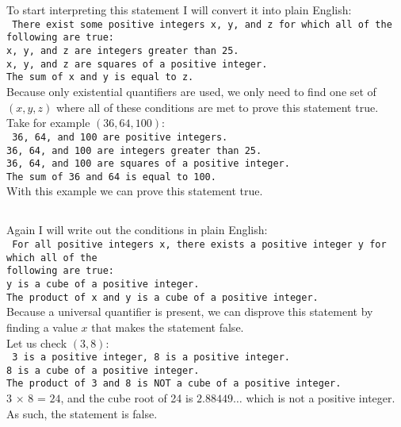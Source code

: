 \documentclass[draft]{article}
\begin{document}
\section{}
\subsection{}
To start interpreting this statement I will convert it into plain English: \\
\texttt{
There exist some positive integers x, y, and z for which all of the following are true: \\
x, y, and z are integers greater than 25. \\
x, y, and z are squares of a positive integer. \\
The sum of x and y is equal to z. \\
}
Because only existential quantifiers are used, we only need to find one set of $(x,y,z)$ 
where all of these conditions are met to prove this statement true. \\
Take for example $(36,64,100)$: \\
\texttt{
36, 64, and 100 are positive integers. \\
36, 64, and 100 are integers greater than 25. \\
36, 64, and 100 are squares of a positive integer. \\
The sum of 36 and 64 is equal to 100. \\
}
With this example we can prove this statement true.

\subsection{}
Again I will write out the conditions in plain English: \\
\texttt{
For all positive integers x, there exists a positive integer y for which all of the \\
following are true: \\
y is a cube of a positive integer. \\
The product of x and y is a cube of a positive integer. \\
}
Because a universal quantifier is present, we can disprove this statement by finding a value $x$ that makes the statement false. \\
Let us check $(3,8)$: \\
\texttt{
3 is a positive integer, 8 is a positive integer. \\
8 is a cube of a positive integer. \\
The product of 3 and 8 is NOT a cube of a positive integer. \\
}
3 $\times$ 8 = $24$, and the cube root of 24 is $2.88449\ldots$ which is not a positive integer. As such, the statement is false.
\end{document}
